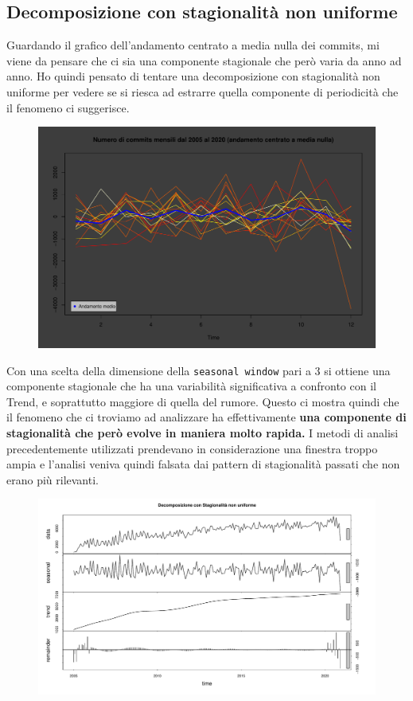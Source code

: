 \documentclass[11pt,a4paper]{article}
\begin{document}
\subsection{Decomposizione con stagionalit\`a non uniforme}
Guardando il grafico dell'andamento centrato a media nulla dei commits, mi viene
da pensare che ci sia una componente stagionale che per\`o varia da anno ad
anno. Ho quindi pensato di tentare una decomposizione con stagionalit\`a non
uniforme per vedere se si riesca ad estrarre quella componente di periodicit\`a
che il fenomeno ci suggerisce.
\clearpage
\begin{figure}[H]
\begin{center}
	\vspace{-1.5cm}
	\includegraphics[scale=0.5]{imgs/heat_colors.pdf}
	\vspace{-0.5cm}
\end{center}
\end{figure}
\noindent
Con una scelta della dimensione della \texttt{seasonal window} pari a 3 si
ottiene una componente stagionale che ha una variabilit\`a significativa a
confronto con il Trend, e soprattutto maggiore di quella del rumore.
Questo ci mostra quindi che il fenomeno che ci troviamo ad analizzare ha
effettivamente \textbf{una componente di stagionalit\`a che per\`o evolve in
maniera molto rapida.} I metodi di analisi precedentemente utilizzati prendevano
in considerazione una finestra troppo ampia e l'analisi veniva quindi falsata
dai pattern di stagionalit\`a passati che non erano pi\`u rilevanti.
\begin{figure}[H]
	\vspace{-0.4cm}
	\hspace{-1.5cm}
	\includegraphics[scale=0.7]{imgs/stl.pdf}
\end{figure}
\end{document}
